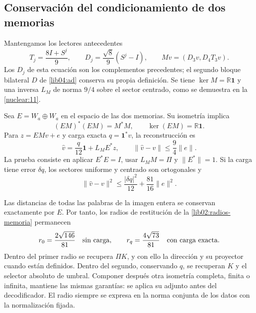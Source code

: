 \subsection{Conservación del condicionamiento de dos memorias}
\label{lib04:dos-memorias}

Mantengamos los lectores antecedentes
\begin{equation}
 T_j=\frac{8I+S^j}{9},\qquad
 D_j=\frac{\sqrt8}{9}(S^j-I),\qquad
 Mv=(D_3v,D_4T_3v).
 \label{lib04:m-antecedente}
\end{equation}
Los \(D_j\) de esta ecuación son los complementos precedentes;
el segundo bloque bilateral \(D\) de \eqref{lib04:ad} conserva
su propia definición. Se tiene \(\ker M=\mathbb R\mathbf1\)
y una inversa \(L_M\) de norma \(9/4\) sobre el sector centrado,
como se demuestra en la \cref{nuclear:11}.

Sea \(E=W_a\oplus W_a\) en el espacio de las dos memorias.
Su isometría implica
\begin{equation}
 (EM)^*(EM)=M^*M,\qquad
 \ker(EM)=\mathbb R\mathbf1.
 \label{lib04:gram-m-preservado}
\end{equation}
Para \(z=EMv+e\) y carga exacta
\(q=\mathbf1^*v\), la reconstrucción es
\begin{equation}
 \widehat v=\frac q{12}\mathbf1+L_ME^*z,\qquad
 \|\widehat v-v\|\leq\frac94\|e\|.
 \label{lib04:inversa-m}
\end{equation}
La prueba consiste en aplicar \(E^*E=I\), usar
\(L_MM=\Pi\) y \(\|E^*\|=1\). Si la carga tiene error
\(\delta q\), los sectores uniforme y centrado son ortogonales y
\begin{equation}
 \|\widehat v-v\|^2
 \leq\frac{|\delta q|^2}{12}+\frac{81}{16}\|e\|^2.
 \label{lib04:error-carga}
\end{equation}

Las distancias de todas las palabras de la imagen entera se conservan
exactamente por \(E\). Por tanto, los radios de restitución de
la \cref{lib02:radios-memoria} permanecen
\begin{equation}
 r_0=\frac{2\sqrt{146}}{81}\quad\hbox{sin carga},\qquad
 r_q=\frac{4\sqrt{73}}{81}\quad\hbox{con carga exacta}.
 \label{lib04:radios}
\end{equation}
Dentro del primer radio se recupera \(\Pi K\), y con ello la
dirección y su proyector cuando están definidos. Dentro del segundo,
conservando \(q\), se recuperan \(K\) y el selector absoluto de
umbral. Componer después otra isometría completa, finita o infinita,
mantiene las mismas garantías: se aplica su adjunto antes del
decodificador. El radio siempre se expresa en la norma conjunta
de los datos con la normalización fijada.

